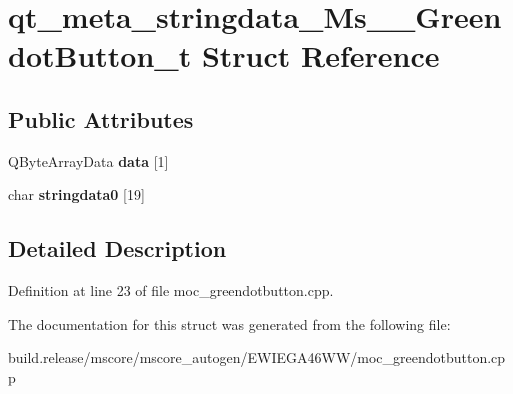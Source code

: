 \hypertarget{structqt__meta__stringdata___ms_____greendot_button__t}{}\section{qt\+\_\+meta\+\_\+stringdata\+\_\+\+Ms\+\_\+\+\_\+\+Greendot\+Button\+\_\+t Struct Reference}
\label{structqt__meta__stringdata___ms_____greendot_button__t}
\subsection*{Public Attributes}
\begin{DoxyCompactItemize}
\item 
\mbox{\label{structqt__meta__stringdata___ms_____greendot_button__t_a35c4b8285430470a848f07f2a670f4b2}} 
Q\+Byte\+Array\+Data {\bfseries data} \mbox{[}1\mbox{]}
\item 
\mbox{\label{structqt__meta__stringdata___ms_____greendot_button__t_a2261009bac67656fb735e6c4f181cd60}} 
char {\bfseries stringdata0} \mbox{[}19\mbox{]}
\end{DoxyCompactItemize}


\subsection{Detailed Description}


Definition at line 23 of file moc\+\_\+greendotbutton.\+cpp.



The documentation for this struct was generated from the following file\+:\begin{DoxyCompactItemize}
\item 
build.\+release/mscore/mscore\+\_\+autogen/\+E\+W\+I\+E\+G\+A46\+W\+W/moc\+\_\+greendotbutton.\+cpp\end{DoxyCompactItemize}
